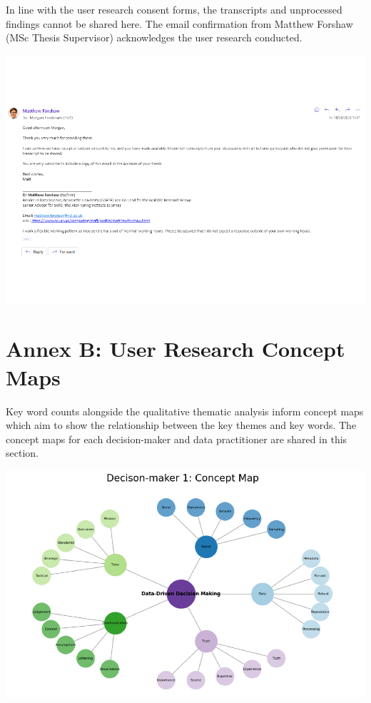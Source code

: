 \documentclass{article}
\begin{document}
In line with the user research consent forms, the transcripts and
unprocessed findings cannot be shared here. The email confirmation from
Matthew Forshaw (MSc Thesis Supervisor) acknowledges the user research
conducted.

\includegraphics[width=1\linewidth]{210431461_CSC8639_Dissertation_files/figure-latex/unnamed-chunk-3-1}
\newpage

\hypertarget{annex-b-user-research-concept-maps}{%
\section{Annex B: User Research Concept
Maps}\label{annex-b-user-research-concept-maps}}

Key word counts alongside the qualitative thematic analysis inform
concept maps which aim to show the relationship between the key themes
and key words. The concept maps for each decision-maker and data
practitioner are shared in this section.

\includegraphics{210431461_CSC8639_Dissertation_files/figure-latex/unnamed-chunk-4-1.pdf}
\end{document}
